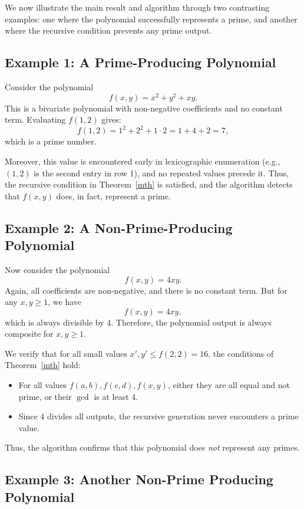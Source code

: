 \documentclass[a4paper,11pt]{article}
\begin{document}
	We now illustrate the main result and algorithm through two contrasting examples: one where the polynomial successfully represents a prime, and another where the recursive condition prevents any prime output.
	
	\subsection{Example 1: A Prime-Producing Polynomial}
	
	Consider the polynomial
	\[
	f(x, y) = x^2 + y^2 + xy.
	\]
	This is a bivariate polynomial with non-negative coefficients and no constant term. Evaluating $f(1,2)$ gives:
	\[
	f(1,2) = 1^2 + 2^2 + 1 \cdot 2 = 1 + 4 + 2 = 7,
	\]
	which is a prime number.
	
	Moreover, this value is encountered early in lexicographic enumeration (e.g., $(1,2)$ is the second entry in row 1), and no repeated values precede it. Thus, the recursive condition in Theorem~\ref{mth} is satisfied, and the algorithm detects that $f(x, y)$ does, in fact, represent a prime.
	
	\subsection{Example 2: A Non-Prime-Producing Polynomial}
	
	Now consider the polynomial
	\[
	f(x, y) = 4xy.
	\]
	Again, all coefficients are non-negative, and there is no constant term. But for any $x, y \geq 1$, we have
	\[
	f(x, y) = 4xy,
	\]
	which is always divisible by 4. Therefore, the polynomial output is always composite for $x, y \geq 1$.
	
	We verify that for all small values $x', y' \leq f(2,2) = 16$, the conditions of Theorem~\ref{mth} hold:
	\begin{itemize}
		\item For all values $f(a,b), f(c,d), f(x,y)$, either they are all equal and not prime, or their $\gcd$ is at least 4.
		\item Since 4 divides all outputs, the recursive generation never encounters a prime value.
	\end{itemize}
	Thus, the algorithm confirms that this polynomial does \emph{not} represent any primes.
	
	\subsection{Example 3: Another Non-Prime Producing Polynomial}
	
\end{document}
